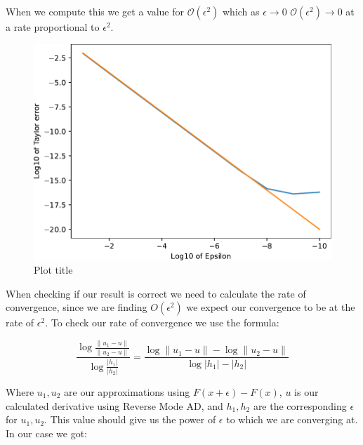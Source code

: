 \documentclass{article}
\begin{document}
When we compute this we get a value for $\mathcal{O}(\epsilon^2)$ which as $\epsilon \longrightarrow 0$ $\mathcal{O}(\epsilon^2) \to 0$ at a rate proportional to $\epsilon^2$.

\begin{figure}[h!]
    \includegraphics[width=12cm]{images/taylor_error_1.pdf}
    \caption{Plot title}
    \label{fig:taylorerror}
\end{figure}

When checking if our result is correct we need to calculate the rate of convergence, since we are finding $O(\epsilon^2)$ we expect our convergence to be at the rate of $\epsilon^2$. To check our rate of convergence we use the formula:

\begin{equation}
    \frac{\log{\frac{\|u_1 - u\|}{\|u_2 - u\|}}}{\log{\frac{|h_1|}{|h_2|}}} = \frac{\log\|u_1 - u\| - \log\|u_2 - u\|}{\log|h_1| - |h_2|}
\end{equation}

Where $u_1, u_2$ are our approximations using $F(x + \epsilon) - F(x)$, $u$ is our calculated derivative using Reverse Mode AD, and $h_1, h_2$ are the corresponding $\epsilon$ for $u_1, u_2$. This value should give us the power of $\epsilon$ to which we are converging at. In our case we got:

\begin{center}
\end{center}
\end{document}

